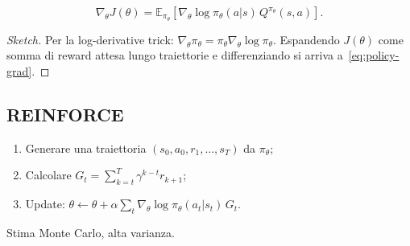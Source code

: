 \begin{theorem}
\begin{equation}\label{eq:policy-grad}
\boxed{\;\nabla_\theta J(\theta) = \mathbb{E}_{\pi_\theta}\!\left[\nabla_\theta \log \pi_\theta(a|s)\, Q^{\pi_\theta}(s,a)\right].\;}
\end{equation}
\end{theorem}
\begin{proof}[Sketch]
Per la log-derivative trick: $\nabla_\theta \pi_\theta = \pi_\theta \nabla_\theta \log \pi_\theta$. Espandendo $J(\theta)$ come somma di reward attesa lungo traiettorie e differenziando si arriva a~\eqref{eq:policy-grad}.
\end{proof}

\subsection{REINFORCE}
\begin{enumerate}
  \item Generare una traiettoria $(s_0, a_0, r_1, \dots, s_T)$ da $\pi_\theta$;
  \item Calcolare $G_t = \sum_{k=t}^T \gamma^{k-t} r_{k+1}$;
  \item Update: $\theta \leftarrow \theta + \alpha \sum_t \nabla_\theta \log \pi_\theta(a_t|s_t)\, G_t$.
\end{enumerate}
Stima Monte Carlo, alta varianza.

